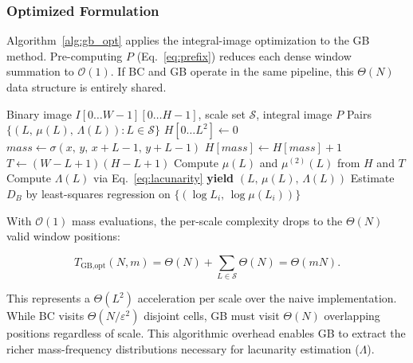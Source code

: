 \subsubsection{Optimized Formulation}

Algorithm~\ref{alg:gb_opt} applies the integral-image optimization to the GB method. Pre-computing $P$ (Eq.~\eqref{eq:prefix}) reduces each dense window summation to $\mathcal{O}(1)$. If BC and GB operate in the same pipeline, this $\Theta(N)$ data structure is entirely shared.

\begin{algorithm}[t]
\caption{Optimized Gliding Box (Integral Image)}
\label{alg:gb_opt}
\begin{algorithmic}[1]
\Require Binary image $I[0\ldots W{-}1][0\ldots H{-}1]$, scale set $\mathcal{S}$, integral image $P$
\Ensure Pairs $\{(L,\, \mu(L),\, \Lambda(L)) : L \in \mathcal{S}\}$
  \State $H[0 \ldots L^{2}] \leftarrow 0$
      \State $\mathit{mass} \leftarrow \sigma(x,\, y,\, x{+}L{-}1,\, y{+}L{-}1)$ \hfill{}
      \State $H[\mathit{mass}] \leftarrow H[\mathit{mass}] + 1$
    \EndFor
  \EndFor
  \State $T \leftarrow (W{-}L{+}1)(H{-}L{+}1)$
  \State Compute $\mu(L)$ and $\mu^{(2)}(L)$ from $H$ and $T$
  \State Compute $\Lambda(L)$ via Eq.~\eqref{eq:lacunarity}
  \State \textbf{yield} $(L,\, \mu(L),\, \Lambda(L))$
\EndFor
\State Estimate $D_B$ by least-squares regression on $\{(\log L_i,\, \log \mu(L_i))\}$
\end{algorithmic}
\end{algorithm}

With $\mathcal{O}(1)$ mass evaluations, the per-scale complexity drops to the $\Theta(N)$ valid window positions:

\begin{equation}
  T_{\text{GB,opt}}(N, m)
    = \Theta(N) + \sum_{L \in \mathcal{S}} \Theta(N)
    = \Theta(mN).
  \label{eq:gb_opt_total}
\end{equation}

This represents a $\Theta(L^{2})$ acceleration per scale over the naive implementation. While BC visits $\Theta(N/\varepsilon^{2})$ disjoint cells, GB must visit $\Theta(N)$ overlapping positions regardless of scale. This algorithmic overhead enables GB to extract the richer mass-frequency distributions necessary for lacunarity estimation ($\Lambda$).


